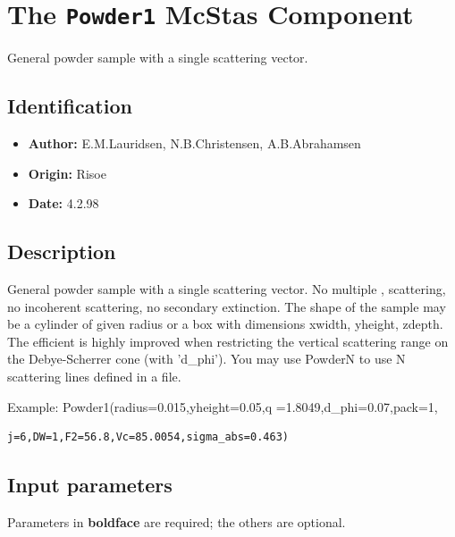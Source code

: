 \section{The \texttt{Powder1} McStas Component}
General powder sample with a single scattering vector.

\subsection*{Identification}
\begin{itemize}
  \item \textbf{Author:} E.M.Lauridsen, N.B.Christensen, A.B.Abrahamsen
  \item \textbf{Origin:} Risoe
  \item \textbf{Date:} 4.2.98
\end{itemize}

\subsection*{Description}
General powder sample with a single scattering vector. No multiple , scattering, no incoherent scattering, no secondary extinction. The shape of the sample may be a cylinder of given radius or a box with dimensions xwidth, yheight, zdepth. The efficient is highly improved when restricting the vertical scattering range on the Debye-Scherrer cone (with 'd\_phi'). You may use PowderN to use N scattering lines defined in a file.

Example: Powder1(radius=0.015,yheight=0.05,q =1.8049,d\_phi=0.07,pack=1,

\begin{verbatim}
j=6,DW=1,F2=56.8,Vc=85.0054,sigma_abs=0.463)
\end{verbatim}

\subsection*{Input parameters}
Parameters in \textbf{boldface} are required; the others are optional.

